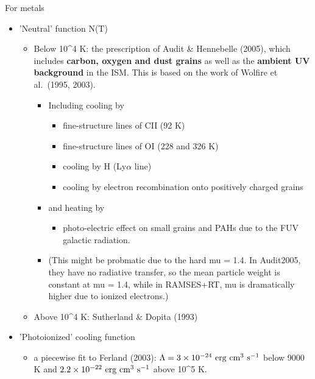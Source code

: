 For metals

\begin{itemize}
\item 'Neutral' function N(T)

\begin{itemize}
\item Below 10\^{}4 K: the prescription of Audit \& Hennebelle (2005), which
includes \textbf{carbon, oxygen and dust grains} as well as the \textbf{ambient
UV background} in the ISM. This is based on the work of Wolfire et
al. (1995, 2003).

\begin{itemize}
\item Including cooling by

\begin{itemize}
\item fine-structure lines of CII (92 K)

\item fine-structure lines of OI (228 and 326 K)

\item cooling by H (Ly$\alpha$ line)

\item cooling by electron recombination onto positively charged
grains
\end{itemize}

\item and heating by

\begin{itemize}
\item photo-electric effect on small grains and PAHs due to the FUV
galactic radiation.
\end{itemize}

\item (This might be probmatic due to the hard mu = 1.4. In Audit2005,
they have no radiative transfer, so the mean particle weight is
constant at mu = 1.4, while in RAMSES+RT, mu is dramatically
higher due to ionized electrons.)
\end{itemize}

\item Above 10\^{}4 K: Sutherland \& Dopita (1993)
\end{itemize}

\item 'Photoionized' cooling function

\begin{itemize}
\item a piecewise fit to Ferland (2003):
\(\Lambda = 3\times10^{-24}~{\rm erg~cm^3~s^{-1}}\) below 9000 K and
\(2.2\times10^{-22}~{\rm erg~cm^3~s^{-1}}\) above 10\^{}5 K.
\end{itemize}
\end{itemize}


